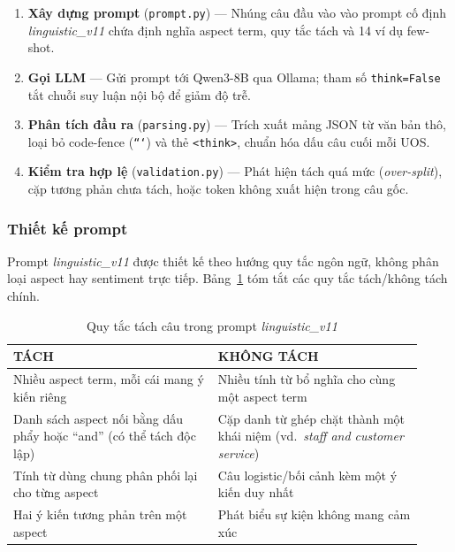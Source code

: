 \begin{enumerate}
  \item \textbf{Xây dựng prompt} (\texttt{prompt.py}) — Nhúng câu đầu
        vào vào prompt cố định \textit{linguistic\_v11} chứa định nghĩa
        aspect term, quy tắc tách và 14 ví dụ few-shot.
  \item \textbf{Gọi LLM} — Gửi prompt tới Qwen3-8B qua Ollama;
        tham số \texttt{think=False} tắt chuỗi suy luận nội bộ để giảm
        độ trễ.
  \item \textbf{Phân tích đầu ra} (\texttt{parsing.py}) — Trích xuất
        mảng JSON từ văn bản thô, loại bỏ code-fence (\texttt{```}) và
        thẻ \texttt{<think>}, chuẩn hóa dấu câu cuối mỗi UOS.
  \item \textbf{Kiểm tra hợp lệ} (\texttt{validation.py}) — Phát hiện
        tách quá mức (\textit{over-split}), cặp tương phản chưa tách,
        hoặc token không xuất hiện trong câu gốc.
\end{enumerate}

\subsubsection*{Thiết kế prompt}

Prompt \textit{linguistic\_v11} được thiết kế theo hướng quy tắc ngôn
ngữ, không phân loại aspect hay sentiment trực tiếp.
Bảng~\ref{tab:uos_rules} tóm tắt các quy tắc tách/không tách chính.

\begin{table}[H]
\centering
\caption{Quy tắc tách câu trong prompt \textit{linguistic\_v11}}
\label{tab:uos_rules}
\small
\begin{tabular}{p{0.46\linewidth} p{0.46\linewidth}}
\toprule
\textbf{TÁCH} & \textbf{KHÔNG TÁCH} \\
\midrule
Nhiều aspect term, mỗi cái mang ý kiến riêng &
Nhiều tính từ bổ nghĩa cho cùng một aspect term \\[4pt]
Danh sách aspect nối bằng dấu phẩy hoặc ``and'' (có thể tách độc lập) &
Cặp danh từ ghép chặt thành một khái niệm
(vd.\ \textit{staff and customer service}) \\[4pt]
Tính từ dùng chung phân phối lại cho từng aspect &
Câu logistic/bối cảnh kèm một ý kiến duy nhất \\[4pt]
Hai ý kiến tương phản trên một aspect &
Phát biểu sự kiện không mang cảm xúc \\
\bottomrule
\end{tabular}
\end{table}


